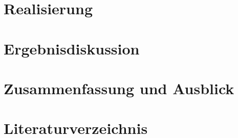 \documentclass[a4paper, 12pt]{scrartcl}
\begin{document}
    \section{Realisierung}
    
    
    \section{Ergebnisdiskussion}
    
    
    \section{Zusammenfassung und Ausblick}
    
 
	\section{Literaturverzeichnis}
	\nocite{*}
    \renewcommand{\refname}{}
	\printbibliography
 
	\newpage
	
\end{document}
